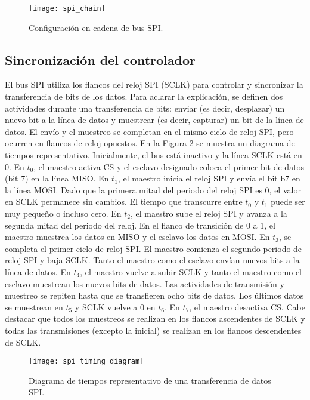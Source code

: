     \begin{figure}[hbtp]
      \centering
      \texttt{[image: spi\_chain]}
      \caption{Configuración en cadena de bus SPI.}
      \label{fig:spi_chain}
    \end{figure}    


    \subsection{Sincronización del controlador}

    El bus SPI utiliza los flancos del reloj SPI (SCLK) para controlar y sincronizar la transferencia de bits de los datos. Para aclarar la explicación, se definen dos actividades durante una transferencia de bits: enviar (es decir, desplazar) un nuevo bit a la línea de datos y muestrear (es decir, capturar) un bit de la línea de datos. El envío y el muestreo se completan en el mismo ciclo de reloj SPI, pero ocurren en flancos de reloj opuestos.
    En la Figura \ref{fig:spi_timing_diagram} se muestra un diagrama de tiempos representativo. Inicialmente, el bus está inactivo y la línea SCLK está en 0. En $t_{0}$, el maestro activa CS y el esclavo designado coloca el primer bit de datos (bit 7) en la línea MISO. En $t_{1}$, el maestro inicia el reloj SPI y envía el bit b7 en la línea MOSI.
Dado que la primera mitad del periodo del reloj SPI es 0, el valor en SCLK permanece sin cambios. El tiempo que transcurre entre $t_{0}$ y $t_{1}$ puede ser muy pequeño o incluso cero. En $t_{2}$, el maestro sube el reloj SPI y avanza a la segunda mitad del periodo del reloj. En el flanco de transición de 0 a 1, el maestro muestrea los datos en MISO y el esclavo los datos en MOSI. 
     En $t_{3}$, se completa el primer ciclo de reloj SPI. El maestro comienza el segundo periodo de reloj SPI y baja SCLK. Tanto el maestro como el esclavo envían nuevos bits a la línea de datos. En $t_{4}$, el maestro vuelve a subir SCLK y tanto el maestro como el esclavo muestrean los nuevos bits de datos. Las actividades de transmisión y muestreo se repiten hasta que se transfieren ocho bits de datos. Los últimos datos se muestrean en $t_{5}$ y SCLK vuelve a 0 en $t_{6}$. En $t_{7}$, el maestro desactiva CS. Cabe destacar que todos los muestreos se realizan en los flancos ascendentes de SCLK y todas las transmisiones (excepto la inicial) se realizan en los flancos descendentes de SCLK.

    \begin{figure}[hbtp]
      \centering
      \texttt{[image: spi\_timing\_diagram]}
      \caption{Diagrama de tiempos representativo de una transferencia de datos SPI.}
      \label{fig:spi_timing_diagram}
    \end{figure}

